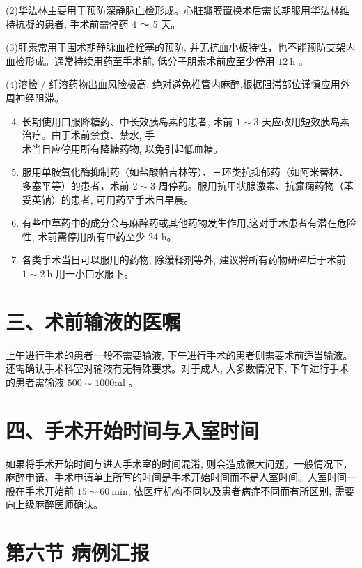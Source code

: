 \documentclass[10pt]{article}
\begin{document}
(2)华法林主要用于预防深静脉血检形成。心脏瓣膜置换术后需长期服用华法林维持抗凝的患者, 手术前需停药 4 〜 5 天。

(3)肝素常用于围术期静脉血栓栓塞的预防, 并无抗血小板特性，也不能预防支架内血检形成。通常持续用药至手术前, 低分子朋素术前应至少停用 $12 \mathrm{~h}$ 。

(4)溶检 / 纤溶药物出血风险极高, 绝对避免椎管内麻醉,根据阻滞部位谨慎应用外周神经阻滞。

\begin{enumerate}
  \setcounter{enumi}{3}
  \item 长期使用口服降糖药、中长效胰岛素的患者, 术前 $1 \sim 3$ 天应改用短效胰岛素治疗。由于术前禁食、禁水, 手\\
术当日应停用所有降糖药物, 以免引起低血糖。

  \item 服用单胺氧化酶抑制药（如盐酸帕吉林等）、三环类抗抑郁药（如阿米替林、多塞平等）的患者，术前 $2 \sim 3$ 周停药。服用抗甲状腺激素、抗癫痫药物（苯妥英钠）的患者, 可用药至手术日早晨。

  \item 有些中草药中的成分会与麻醉药或其他药物发生作用,这对手术患者有潜在危险性, 术前需停用所有中药至少 24 h。

  \item 各类手术当日可以服用的药物, 除缓释剂等外, 建议将所有药物研碎后于术前 $1 \sim 2 \mathrm{~h}$ 用一小口水服下。

\end{enumerate}

\section*{三、术前输液的医嘱}
上午进行手术的患者一般不需要输液, 下午进行手术的患者则需要术前适当输液。还需确认手术科室对输液有无特殊要求。对于成人, 大多数情况下, 下午进行手术的患者需输液 $500 \sim 1000 \mathrm{ml}$ 。

\section*{四、手术开始时间与入室时间}
如果将手术开始时间与进人手术室的时间混淆, 则会造成很大问题。一般情况下，麻醉申请、手术申请单上所写的时间是手术开始时间而不是人室时间。人室时间一般在手术开始前 $15 \sim 60 \mathrm{~min}$, 依医疗机构不同以及患者病症不同而有所区别, 需要向上级麻醉医师确认。

\section*{第六节 病例汇报}
\end{document}
